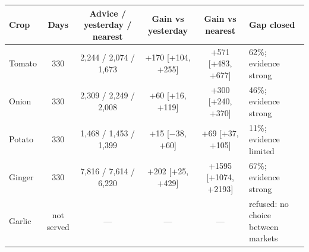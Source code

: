 \renewcommand{\arraystretch}{1.25}
\footnotesize
\begin{tabular}{|l|c|c|c|c|l|}
\hline
\textbf{Crop} & \textbf{Days} & \textbf{Advice / yesterday / nearest} & \textbf{Gain vs yesterday} & \textbf{Gain vs nearest} & \textbf{Gap closed} \\
\hline
Tomato & 330 & 2,244 / 2,074 / 1,673 & +170 [+104, +255] & +571 [+483, +677] & 62\%; evidence strong \\
\hline
Onion & 330 & 2,309 / 2,249 / 2,008 & +60 [+16, +119] & +300 [+240, +370] & 46\%; evidence strong \\
\hline
Potato & 330 & 1,468 / 1,453 / 1,399 & +15 [$-$38, +60] & +69 [+37, +105] & 11\%; evidence limited \\
\hline
Ginger & 330 & 7,816 / 7,614 / 6,220 & +202 [+25, +429] & +1595 [+1074, +2193] & 67\%; evidence strong \\
\hline
Garlic & not served & --- & --- & --- & refused: no choice between markets \\
\hline
\end{tabular}
